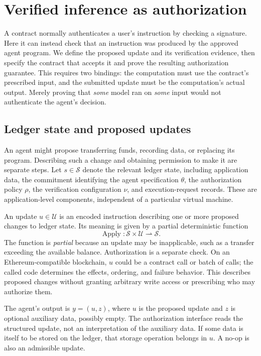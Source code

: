 \documentclass[10pt,letterpaper]{article}
\begin{document}
\section{Verified inference as authorization}
\label{sec:model}
A contract normally authenticates a user's instruction by checking a signature. Here it can instead check that an instruction was produced by the approved agent program. We define the proposed update and its verification evidence, then specify the contract that accepts it and prove the resulting authorization guarantee. This requires two bindings: the computation must use the contract's prescribed input, and the submitted update must be the computation's actual output. Merely proving that \emph{some} model ran on \emph{some} input would not authenticate the agent's decision.

\subsection{Ledger state and proposed updates}
An agent might propose transferring funds, recording data, or replacing its program. Describing such a change and obtaining permission to make it are separate steps. Let $s\in\mathcal S$ denote the relevant ledger state, including application data, the commitment identifying the agent specification $\theta$, the authorization policy $\rho$, the verification configuration $\nu$, and execution-request records. These are application-level components, independent of a particular virtual machine.

An update $u\in\mathcal U$ is an encoded instruction describing one or more proposed changes to ledger state. Its meaning is given by a partial deterministic function
\[
 \operatorname{Apply}:\mathcal S\times\mathcal U\rightharpoonup\mathcal S.
\]
The function is \emph{partial} because an update may be inapplicable, such as a transfer exceeding the available balance. Authorization is a separate check. On an Ethereum-compatible blockchain, $u$ could be a contract call or batch of calls; the called code determines the effects, ordering, and failure behavior. This describes proposed changes without granting arbitrary write access or prescribing who may authorize them.

The agent's output is $y=(u,z)$, where $u$ is the proposed update and $z$ is optional auxiliary data, possibly empty. The authorization interface reads the structured update, not an interpretation of the auxiliary data. If some data is itself to be stored on the ledger, that storage operation belongs in $u$. A no-op is also an admissible update.
\end{document}
